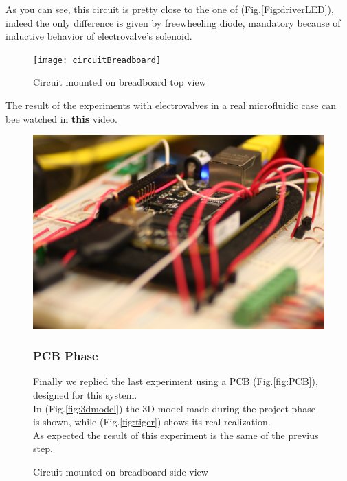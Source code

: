 \documentclass[12pt,a4paper,twoside]{article}
\begin{document}
	As you can see, this circuit is pretty close to the one of (Fig.\ref{Fig:driverLED}), indeed the only difference is given by freewheeling diode, mandatory because of inductive behavior of electrovalve's solenoid.
	
	\begin{figure}[h]
		\centering
		\texttt{[image: circuitBreadboard]}
		\caption{Circuit mounted on breadboard top view}
		\label{Fig:circuitBreadboard}
	\end{figure}
	
	
	The result of the experiments with electrovalves in a real microfluidic case can bee watched in  \href{https://www.youtube.com/watch?v=CavCVnD2P1k}{\textbf{this}} video.
	
	\begin{figure}[h]
		\begin{center}
		\includegraphics[width=\textwidth]{breadboard}
		\caption{Circuit mounted on breadboard side view}
		\label{Fig:circuitsfumatp}
	\end{center}
	\subsubsection*{PCB Phase}
	
	Finally we replied the last experiment using a PCB (Fig.\ref{fig:PCB}),  designed for this system.\\
	In (Fig.\ref{fig:3dmodel}) the 3D model made during the project phase is shown, while (Fig.\ref{fig:tiger}) shows its real realization.\\
	As expected the result of this experiment is the same of the previus step. 
	\end{figure}
	
\end{document}
